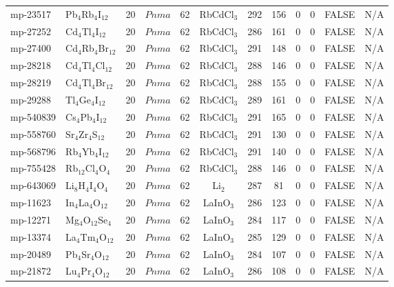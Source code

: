 {\begin{longtable}{llcccccccccc}
    mp-23517 & Pb$_{4}$Rb$_{4}$I$_{12}$ & 20    & $Pnma$ & 62    & RbCdCl$_{3}$ & 292   & 156   & 0     & 0     & FALSE & N/A \\
    mp-27252 & Cd$_{4}$Tl$_{4}$I$_{12}$ & 20    & $Pnma$ & 62    & RbCdCl$_{3}$ & 286   & 161   & 0     & 0     & FALSE & N/A \\
    mp-27400 & Cd$_{4}$Rb$_{4}$Br$_{12}$ & 20    & $Pnma$ & 62    & RbCdCl$_{3}$ & 291   & 148   & 0     & 0     & FALSE & N/A \\
    mp-28218 & Cd$_{4}$Tl$_{4}$Cl$_{12}$ & 20    & $Pnma$ & 62    & RbCdCl$_{3}$ & 288   & 146   & 0     & 0     & FALSE & N/A \\
    mp-28219 & Cd$_{4}$Tl$_{4}$Br$_{12}$ & 20    & $Pnma$ & 62    & RbCdCl$_{3}$ & 288   & 155   & 0     & 0     & FALSE & N/A \\
    mp-29288 & Tl$_{4}$Ge$_{4}$I$_{12}$ & 20    & $Pnma$ & 62    & RbCdCl$_{3}$ & 289   & 161   & 0     & 0     & FALSE & N/A \\
    mp-540839 & Cs$_{4}$Pb$_{4}$I$_{12}$ & 20    & $Pnma$ & 62    & RbCdCl$_{3}$ & 291   & 165   & 0     & 0     & FALSE & N/A \\
    mp-558760 & Sr$_{4}$Zr$_{4}$S$_{12}$ & 20    & $Pnma$ & 62    & RbCdCl$_{3}$ & 291   & 130   & 0     & 0     & FALSE & N/A \\
    mp-568796 & Rb$_{4}$Yb$_{4}$I$_{12}$ & 20    & $Pnma$ & 62    & RbCdCl$_{3}$ & 291   & 140   & 0     & 0     & FALSE & N/A \\
    mp-755428 & Rb$_{12}$Cl$_{4}$O$_{4}$ & 20    & $Pnma$ & 62    & RbCdCl$_{3}$ & 288   & 146   & 0     & 0     & FALSE & N/A \\
    mp-643069 & Li$_{8}$H$_{4}$I$_{4}$O$_{4}$ & 20    & $Pnma$ & 62    & Li$_{2}$ & 287   & 81    & 0     & 0     & FALSE & N/A \\
    mp-11623 & In$_{4}$La$_{4}$O$_{12}$ & 20    & $Pnma$ & 62    & LaInO$_{3}$ & 286   & 123   & 0     & 0     & FALSE & N/A \\
    mp-12271 & Mg$_{4}$O$_{12}$Se$_{4}$ & 20    & $Pnma$ & 62    & LaInO$_{3}$ & 284   & 117   & 0     & 0     & FALSE & N/A \\
    mp-13374 & La$_{4}$Tm$_{4}$O$_{12}$ & 20    & $Pnma$ & 62    & LaInO$_{3}$ & 285   & 129   & 0     & 0     & FALSE & N/A \\
    mp-20489 & Pb$_{4}$Sr$_{4}$O$_{12}$ & 20    & $Pnma$ & 62    & LaInO$_{3}$ & 284   & 107   & 0     & 0     & FALSE & N/A \\
    mp-21872 & Lu$_{4}$Pr$_{4}$O$_{12}$ & 20    & $Pnma$ & 62    & LaInO$_{3}$ & 286   & 108   & 0     & 0     & FALSE & N/A \\

\end{longtable}}

